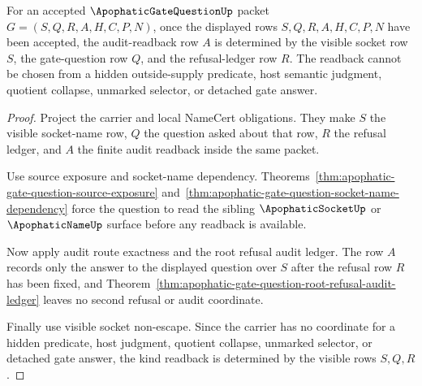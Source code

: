 \begin{theorem}
\label{thm:apophatic-gate-question-kind-readback-determinacy}
For an accepted $\ApophaticGateQuestionUp$ packet $G=(S,Q,R,A,H,C,P,N)$, once the displayed rows $S,Q,R,A,H,C,P,N$ have been accepted, the audit-readback row $A$ is determined by the visible socket row $S$, the gate-question row $Q$, and the refusal-ledger row $R$. The readback cannot be chosen from a hidden outside-supply predicate, host semantic judgment, quotient collapse, unmarked selector, or detached gate answer.
\end{theorem}
\begin{proof}
Project the carrier and local NameCert obligations. They make $S$ the visible socket-name row, $Q$ the question asked about that row, $R$ the refusal ledger, and $A$ the finite audit readback inside the same packet.

Use source exposure and socket-name dependency. Theorems~\ref{thm:apophatic-gate-question-source-exposure} and~\ref{thm:apophatic-gate-question-socket-name-dependency} force the question to read the sibling $\ApophaticSocketUp$ or $\ApophaticNameUp$ surface before any readback is available.

Now apply audit route exactness and the root refusal audit ledger. The row $A$ records only the answer to the displayed question over $S$ after the refusal row $R$ has been fixed, and Theorem~\ref{thm:apophatic-gate-question-root-refusal-audit-ledger} leaves no second refusal or audit coordinate.

Finally use visible socket non-escape. Since the carrier has no coordinate for a hidden predicate, host judgment, quotient collapse, unmarked selector, or detached gate answer, the kind readback is determined by the visible rows $S,Q,R$.
\end{proof}

